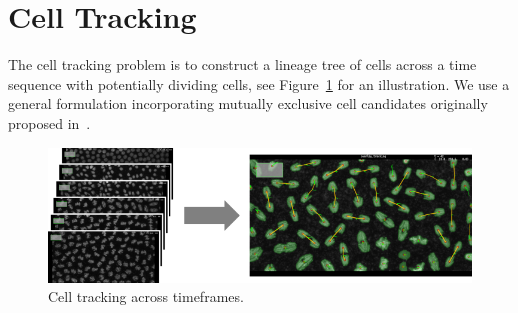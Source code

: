 \section{Cell Tracking}
The cell tracking problem is to construct a lineage tree of cells across a time sequence with potentially dividing cells, see Figure~\ref{fig:cell-tracking} for an illustration.
We use a general formulation incorporating mutually exclusive cell candidates originally proposed in~\cite{funke2012efficient}.

\begin{figure}[H]
    \begin{center}
        \includegraphics[width=\columnwidth]{images/cell-tracking.png}
        \caption{Cell tracking across timeframes.}
        \label{fig:cell-tracking}
    \end{center}
\end{figure}

